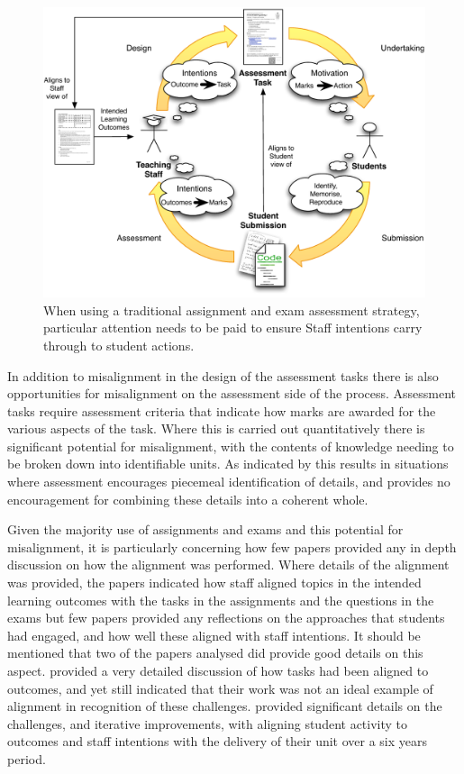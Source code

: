 \begin{figure}[htbp]
	\centering
	\includegraphics[width=\textwidth]{Misalignment}
	\caption{When using a traditional assignment and exam assessment strategy, particular attention needs to be paid to ensure Staff intentions carry through to student actions.}
	\label{fig:misalignment}
\end{figure}

In addition to misalignment in the design of the assessment tasks there is also opportunities for misalignment on the assessment side of the process. Assessment tasks require assessment criteria that indicate how marks are awarded for the various aspects of the task. Where this is carried out quantitatively there is significant potential for misalignment, with the contents of knowledge needing to be broken down into identifiable units. As indicated by \citet{Biggs:1996c} this results in situations where assessment encourages piecemeal identification of details, and provides no encouragement for combining these details into a coherent whole.

Given the majority use of assignments and exams and this potential for misalignment, it is particularly concerning how few papers provided any in depth discussion on how the alignment was performed. Where details of the alignment was provided, the papers indicated how staff aligned topics in the intended learning outcomes with the tasks in the assignments and the questions in the exams but few papers provided any reflections on the approaches that students had engaged, and how well these aligned with staff intentions. It should be mentioned that two of the papers analysed did provide good details on this aspect. \citet{Brabrand:2008} provided a very detailed discussion of how tasks had been aligned to outcomes, and yet still indicated that their work was not an ideal example of alignment in recognition of these challenges. \citet{Hill:2009} provided significant details on the challenges, and iterative improvements, with aligning student activity to outcomes and staff intentions with the delivery of their unit over a six years period. 

